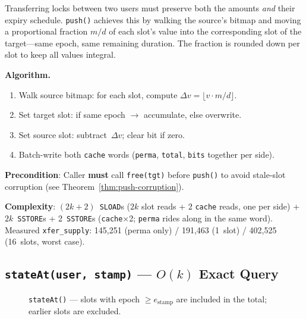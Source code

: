 \documentclass[10pt,a4paper,twocolumn]{article}
\begin{document}
Transferring locks between two users must preserve both the amounts \emph{and} their expiry schedule.  \texttt{push()} achieves this by walking the source's bitmap and moving a proportional fraction $m/d$ of each slot's value into the corresponding slot of the target---same epoch, same remaining duration.  The fraction is rounded down per slot to keep all values integral.

\textbf{Algorithm.}
\begin{enumerate}[leftmargin=*, nosep]
\item Walk source bitmap: for each slot, compute $\Delta v = \lfloor v \cdot m / d \rfloor$.
\item Set target slot: if same epoch $\to$ accumulate, else overwrite.
\item Set source slot: subtract~$\Delta v$; clear bit if zero.
\item Batch-write both \texttt{cache} words (\texttt{perma}, \texttt{total}, \texttt{bits} together per side).
\end{enumerate}

\textbf{Precondition}: Caller \textbf{must} call \texttt{free(tgt)} before \texttt{push()} to avoid stale-slot corruption (see Theorem~\ref{thm:push-corruption}).

\textbf{Complexity}: $(2k{+}2)$~\texttt{SLOAD}s ($2k$ slot reads + $2$ \texttt{cache} reads, one per side) + $2k$~\texttt{SSTORE}s + 2~\texttt{SSTORE}s (\texttt{cache}$\times$2; \texttt{perma} rides along in the same word). Measured \texttt{xfer\_supply}: 145{,}251 (perma only) / 191{,}463 (1~slot) / 402{,}525 (16~slots, worst case).

\subsection{\texttt{stateAt(user, stamp)} --- $O(k)$ Exact Query}
\label{subsec:stateat}

\begin{figure}[htbp]
\centering
{}
\caption{\texttt{stateAt()} --- slots with epoch $\geq e_{\text{stamp}}$ are included in the total; earlier slots are excluded.}
\label{fig:stateat}
\end{figure}
\end{document}
